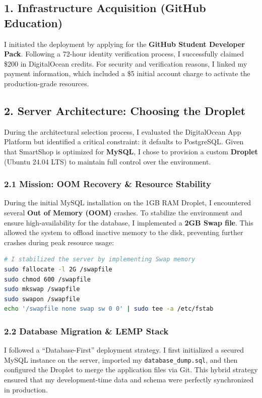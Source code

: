 \documentclass[12pt,a4paper]{article}
\begin{document}
\subsection{1. Infrastructure Acquisition (GitHub Education)}
I initiated the deployment by applying for the \textbf{GitHub Student Developer Pack}. Following a 72-hour identity verification process, I successfully claimed \$200 in DigitalOcean credits. For security and verification reasons, I linked my payment information, which included a \$5 initial account charge to activate the production-grade resources.

\subsection{2. Server Architecture: Choosing the Droplet}
During the architectural selection process, I evaluated the DigitalOcean App Platform but identified a critical constraint: it defaults to PostgreSQL. Given that SmartShop is optimized for \textbf{MySQL}, I chose to provision a custom \textbf{Droplet} (Ubuntu 24.04 LTS) to maintain full control over the environment.

\subsubsection{2.1 Mission: OOM Recovery \& Resource Stability}
During the initial MySQL installation on the 1GB RAM Droplet, I encountered several \textbf{Out of Memory (OOM)} crashes. To stabilize the environment and ensure high-availability for the database, I implemented a \textbf{2GB Swap file}. This allowed the system to offload inactive memory to the disk, preventing further crashes during peak resource usage:
\begin{lstlisting}[language=bash]
# I stabilized the server by implementing Swap memory
sudo fallocate -l 2G /swapfile
sudo chmod 600 /swapfile
sudo mkswap /swapfile
sudo swapon /swapfile
echo '/swapfile none swap sw 0 0' | sudo tee -a /etc/fstab
\end{lstlisting}

\subsubsection{2.2 Database Migration \& LEMP Stack}
I followed a ``Database-First'' deployment strategy. I first initialized a secured MySQL instance on the server, imported my \texttt{database\_dump.sql}, and then configured the Droplet to merge the application files via Git. This hybrid strategy ensured that my development-time data and schema were perfectly synchronized in production.
\end{document}
